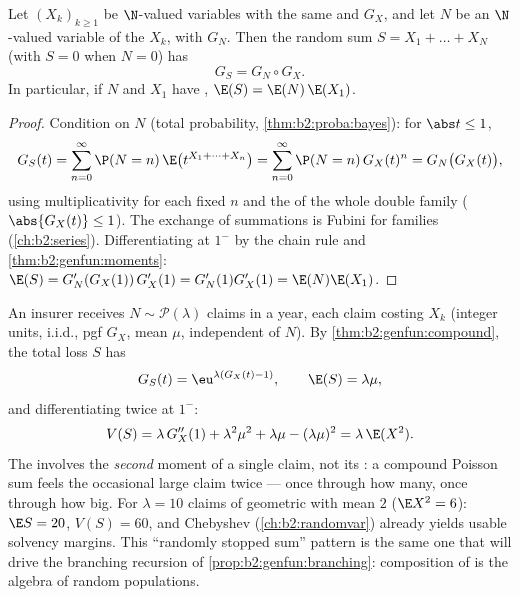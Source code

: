 \begin{theorem}\label{thm:b2:genfun:compound}
Let $(X_k)_{k\geq1}$ be  $\N$-valued variables with the
same  and  $G_X$, and let $N$ be an
$\N$-valued variable  of the $X_k$, with  $G_N$. Then the random sum $S = X_1 + \dots + X_N$ (with
$S = 0$ when $N = 0$) has 
\[
G_S = G_N \circ G_X .
\]
In particular, if $N$ and $X_1$ have , $\E(S) =
\E(N)\,\E(X_1)$.
\end{theorem}

\begin{proof}
Condition on $N$ (total probability,
\cref{thm:b2:proba:bayes}): for $\abs t \leq 1$,
\[
G_S(t) = \sum_{n=0}^\infty \P(N = n)\,
\E\bigl(t^{X_1 + \dots + X_n}\bigr)
= \sum_{n=0}^\infty \P(N = n)\,G_X(t)^n
= G_N\bigl(G_X(t)\bigr),
\]
using multiplicativity for each fixed $n$ and the  of
the whole double family ($\abs{G_X(t)} \leq 1$). The exchange of
summations is Fubini for  families
(\cref{ch:b2:series}). Differentiating at $1^-$ by the chain rule
and \cref{thm:b2:genfun:moments}: $\E(S) = G_N'(G_X(1))\,G_X'(1)
= G_N'(1)G_X'(1) = \E(N)\E(X_1)$.
\end{proof}

\begin{example}\label{ex:b2:genfun:compoundpoisson}
An insurer receives $N \sim \mathcal P(\lambda)$ claims in a
year, each claim costing $X_k$ (integer units, i.i.d., pgf
$G_X$, mean $\mu$, independent of $N$). By
\cref{thm:b2:genfun:compound}, the total loss $S$ has
\[
G_S(t) = \eu^{\lambda(G_X(t) - 1)},
\qquad
\E(S) = \lambda\mu ,
\]
and differentiating twice at $1^-$:
\[
V(S) = \lambda\,G_X''(1) + \lambda^2\mu^2 + \lambda\mu -
(\lambda\mu)^2 = \lambda\,\E(X^2) .
\]
The  involves the \emph{second} moment of a single
claim, not its : a compound Poisson sum feels the
occasional large claim twice --- once through how many, once
through how big. For $\lambda = 10$ claims of geometric 
with mean $2$ ($\E X^2 = 6$): $\E S = 20$, $V(S) = 60$, and
Chebyshev (\cref{ch:b2:randomvar}) already yields usable
solvency margins. This ``randomly stopped sum'' pattern is the
same one that will drive the branching recursion of
\cref{prop:b2:genfun:branching}: composition of  is the algebra of random populations.
\end{example}

